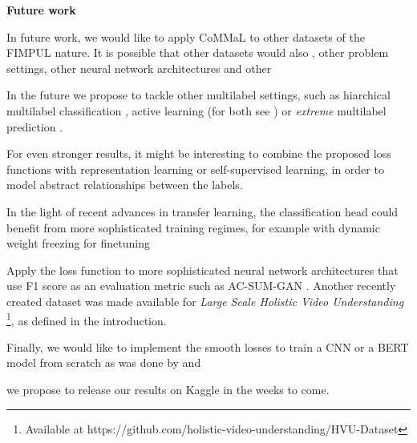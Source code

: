 \textbf{Future work}

In future work, we would like to apply CoMMaL to other datasets of the FIMPUL nature. It is possible that other datasets would also , other problem settings, other neural network architectures and other 

In the future we propose to tackle other multilabel settings, such as hiarchical multilabel classification \cite{HARAM},  active learning (for both see \cite{activeLearningMultiLabel}) or \emph{extreme} multilabel prediction \cite{extremeMultilabelText, extremeSIGIR}.

For even stronger results, it might be interesting to combine the proposed loss functions with representation learning \cite{unsupervisedImage,highResRepresentation} or self-supervised learning, in order to model abstract relationships between the labels.

In the light of recent advances in transfer learning, the classification head could benefit from more sophisticated training regimes, for example with dynamic weight freezing for finetuning~\cite{ULMFit}


Apply the loss function to more sophisticated neural network architectures that use F1 score as an evaluation metric such as AC-SUM-GAN \cite{AC-SUM-GAN}. Another recently created dataset was made available for \emph{Large Scale Holistic Video Understanding} \cite{holisticVideoData}\footnote{Available at https://github.com/holistic-video-understanding/HVU-Dataset}, as defined in the introduction.


Finally, we would like to implement the smooth losses to train a CNN or a BERT model from scratch as was done by \cite{tencent} and \cite{focalLoss}

we propose to release our results on Kaggle in the weeks to come.




